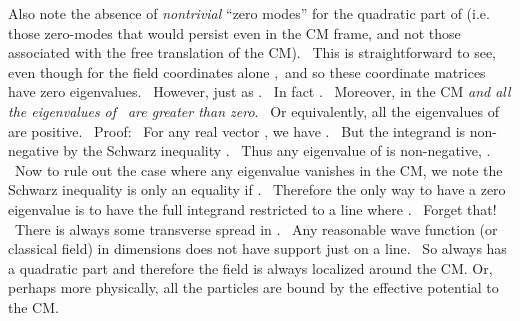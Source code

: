 \documentclass[a4paper,12pt]{article}%
\begin{document}
Also note the absence of \emph{nontrivial} ``zero modes'' for the quadratic
part of \coordHE{} (i.e. those zero-modes that would persist even in the CM frame,
and not those associated with the free translation of the CM). \ This is
straightforward to see, even though for the field coordinates alone
\coordHE{},\ and so these coordinate matrices have zero eigenvalues.
\ However, \coordHE{} just as \coordHE{}. \ In fact \coordHE{}. \ Moreover, in the CM
\coordHE{} \emph{and all the eigenvalues of }\coordHE{}\emph{\ are greater than
zero}. \ Or equivalently, all the eigenvalues of \coordHE{} are
positive. \ Proof: \ For any real vector \coordHE{}, we have \coordHE{}. \ But the integrand is non-negative by the Schwarz inequality
\coordHE{}. \ Thus any eigenvalue
\myHighlight{$\lambda$}\coordHE{} of \coordHE{} is non-negative, \coordHE{}. \ Now to rule out the
case where any eigenvalue vanishes in the CM, we note the Schwarz inequality
is only an equality \coordHE{} if
\coordHE{}. \ Therefore the only way to have a zero eigenvalue is to
have the full integrand \coordHE{} restricted to a
line where \coordHE{}. \ Forget that! \ There is always some
transverse spread in \coordHE{}. \ Any
reasonable wave function (or classical field) in \coordHE{} dimensions does not
have support just on a line. \ So \coordHE{}
always has a quadratic \coordHE{} part and therefore the field is always
localized around the CM. Or, perhaps more physically, all the particles are
bound by the effective potential to the CM.
\end{document}
